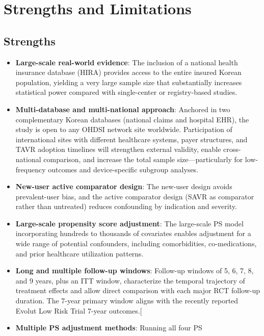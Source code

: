\documentclass[
  12pt,
]{article}
\providecommand{\tightlist}{%
  \setlength{\itemsep}{0pt}\setlength{\parskip}{0pt}}
\begin{document}
\section{Strengths and Limitations}\label{strengths-limitations}

\subsection{Strengths}\label{strengths}

\begin{itemize}
\tightlist
\item
  \textbf{Large-scale real-world evidence}: The inclusion of a national
  health insurance database (HIRA) provides access to the entire insured
  Korean population, yielding a very large sample size that
  substantially increases statistical power compared with single-center
  or registry-based studies.
\item
  \textbf{Multi-database and multi-national approach}: Anchored in two
  complementary Korean databases (national claims and hospital EHR), the
  study is open to any OHDSI network site worldwide. Participation of
  international sites with different healthcare systems, payer
  structures, and TAVR adoption timelines will strengthen external
  validity, enable cross-national comparison, and increase the total
  sample size---particularly for low-frequency outcomes and
  device-specific subgroup analyses.
\item
  \textbf{New-user active comparator design}: The new-user design avoids
  prevalent-user bias, and the active comparator design (SAVR as
  comparator rather than untreated) reduces confounding by indication
  and severity.
\item
  \textbf{Large-scale propensity score adjustment}: The large-scale PS
  model incorporating hundreds to thousands of covariates enables
  adjustment for a wide range of potential confounders, including
  comorbidities, co-medications, and prior healthcare utilization
  patterns.
\item
  \textbf{Long and multiple follow-up windows}: Follow-up windows of 5,
  6, 7, 8, and 9 years, plus an ITT window, characterize the temporal
  trajectory of treatment effects and allow direct comparison with each
  major RCT follow-up duration. The 7-year primary window aligns with
  the recently reported Evolut Low Risk Trial 7-year
  outcomes.{[}\citeproc{ref-Forrest2026}{16}{]}
\item
  \textbf{Multiple PS adjustment methods}: Running all four PS

\end{itemize}
\end{document}
